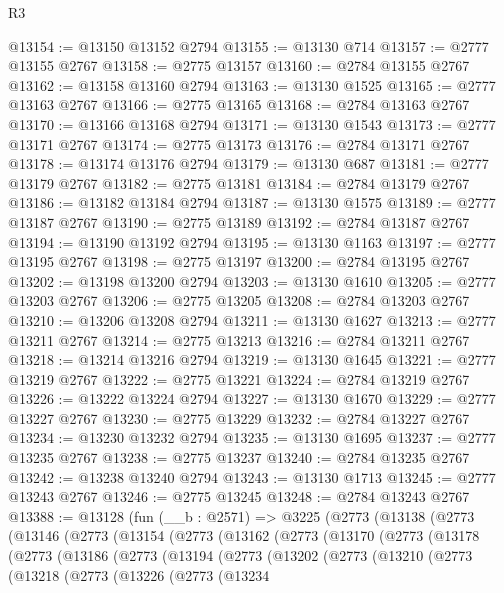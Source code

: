 \begin{lexlean}{R3}
\begin{coremodule}
@13154 := @13150 @13152 @2794
@13155 := @13130 @714
@13157 := @2777 @13155 @2767
@13158 := @2775 @13157
@13160 := @2784 @13155 @2767
@13162 := @13158 @13160 @2794
@13163 := @13130 @1525
@13165 := @2777 @13163 @2767
@13166 := @2775 @13165
@13168 := @2784 @13163 @2767
@13170 := @13166 @13168 @2794
@13171 := @13130 @1543
@13173 := @2777 @13171 @2767
@13174 := @2775 @13173
@13176 := @2784 @13171 @2767
@13178 := @13174 @13176 @2794
@13179 := @13130 @687
@13181 := @2777 @13179 @2767
@13182 := @2775 @13181
@13184 := @2784 @13179 @2767
@13186 := @13182 @13184 @2794
@13187 := @13130 @1575
@13189 := @2777 @13187 @2767
@13190 := @2775 @13189
@13192 := @2784 @13187 @2767
@13194 := @13190 @13192 @2794
@13195 := @13130 @1163
@13197 := @2777 @13195 @2767
@13198 := @2775 @13197
@13200 := @2784 @13195 @2767
@13202 := @13198 @13200 @2794
@13203 := @13130 @1610
@13205 := @2777 @13203 @2767
@13206 := @2775 @13205
@13208 := @2784 @13203 @2767
@13210 := @13206 @13208 @2794
@13211 := @13130 @1627
@13213 := @2777 @13211 @2767
@13214 := @2775 @13213
@13216 := @2784 @13211 @2767
@13218 := @13214 @13216 @2794
@13219 := @13130 @1645
@13221 := @2777 @13219 @2767
@13222 := @2775 @13221
@13224 := @2784 @13219 @2767
@13226 := @13222 @13224 @2794
@13227 := @13130 @1670
@13229 := @2777 @13227 @2767
@13230 := @2775 @13229
@13232 := @2784 @13227 @2767
@13234 := @13230 @13232 @2794
@13235 := @13130 @1695
@13237 := @2777 @13235 @2767
@13238 := @2775 @13237
@13240 := @2784 @13235 @2767
@13242 := @13238 @13240 @2794
@13243 := @13130 @1713
@13245 := @2777 @13243 @2767
@13246 := @2775 @13245
@13248 := @2784 @13243 @2767
@13388 := @13128
    (fun (__b : @2571) =>
    @3225
      (@2773
        (@13138
          (@2773
            (@13146
              (@2773
                (@13154
                  (@2773
                    (@13162
                      (@2773
                        (@13170
                          (@2773
                            (@13178
                              (@2773
                                (@13186
                                  (@2773
                                    (@13194
                                      (@2773
                                        (@13202
                                          (@2773
                                            (@13210
                                              (@2773
                                                (@13218
                                                  (@2773
                                                    (@13226
                                                      (@2773
                                                        (@13234

\end{coremodule}
\end{lexlean}
